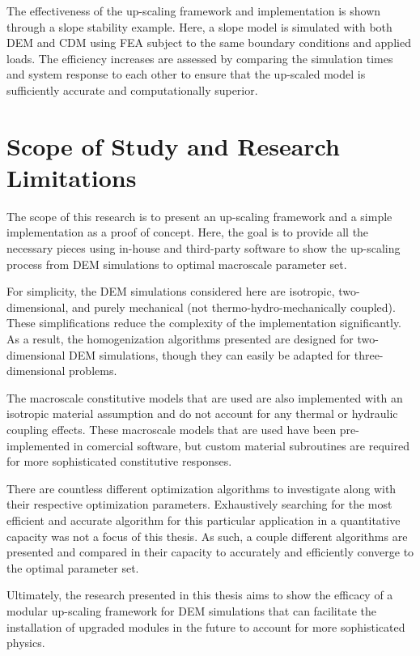 The effectiveness of the up-scaling framework and implementation is shown through a slope stability example. Here, a slope model is simulated with both DEM and CDM using FEA subject to the same boundary conditions and applied loads. The efficiency increases are assessed by comparing the simulation times and system response to each other to ensure that the up-scaled model is sufficiently accurate and computationally superior.

\section{Scope of Study and Research Limitations}

The scope of this research is to present an up-scaling framework and a simple implementation as a proof of concept. Here, the goal is to provide all the necessary pieces using in-house and third-party software to show the up-scaling process from DEM simulations to optimal macroscale parameter set. 

For simplicity, the DEM simulations considered here are isotropic, two-dimensional, and purely mechanical (not thermo-hydro-mechanically coupled). These simplifications reduce the complexity of the implementation significantly. As a result, the homogenization algorithms presented are designed for two-dimensional DEM simulations, though they can easily be adapted for three-dimensional problems.

The macroscale constitutive models that are used are also implemented with an isotropic material assumption and do not account for any thermal or hydraulic coupling effects. These macroscale models that are used have been pre-implemented in comercial software, but custom material subroutines are required for more sophisticated constitutive responses. 

There are countless different optimization algorithms to investigate along with their respective optimization parameters. Exhaustively searching for the most efficient and accurate algorithm for this particular application in a quantitative capacity was not a focus of this thesis. As such, a couple different algorithms are presented and compared in their capacity to accurately and efficiently converge to the optimal parameter set.

Ultimately, the research presented in this thesis aims to show the efficacy of a modular up-scaling framework for DEM simulations that can facilitate the installation of upgraded modules in the future to account for more sophisticated physics.
